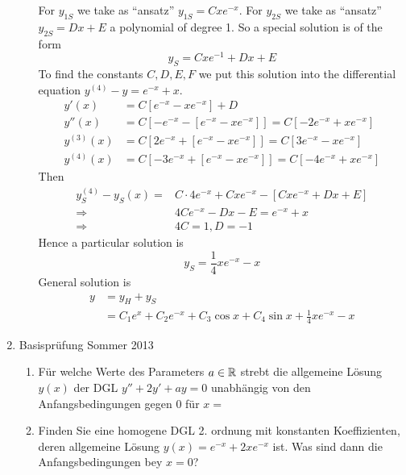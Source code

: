 \documentclass[a4paper]{article}
\begin{document}
\begin{enumerate}
\begin{enumerate}
For $y_{1S}$ we take as ``ansatz'' $y_{1S}= Cxe^{-x}$. For $y_{2S}$ we take as ``ansatz'' $y_{2S}= Dx+E$ a polynomial of degree 1. So a special solution is of the form 
\[y_S = Cxe^{-1}+Dx+E\]
To find the constants $C,D,E,F$ we put this solution into the differential equation $y^{(4)}-y=e^{-x}+x$.
\begin{align*}
y'(x)&=C\left[e^{-x}-xe^{-x}\right]+D\\
y''(x)&=C\left[-e^{-x}-\left[e^{-x}-xe^{-x}\right]\right] = C\left[ -2e^{-x}+xe^{-x}\right]\\
y^{(3)}(x)&=C\left[2e^{-x}+\left[e^{-x}-xe^{-x}\right]\right] = C\left[3e^{-x}-xe^{-x}\right]\\
y^{(4)}(x)&=C\left[-3e^{-x}+\left[e^{-x}-xe^{-x}\right]\right] = C\left[-4e^{-x}+xe^{-x}\right]
\end{align*}
Then 
\begin{align*}
y^{(4)}_S-y_S(x) =& C\cdot 4e^{-x}+Cxe^{-x}-\left[ Cxe^{-x}+Dx+E\right]\\
\Rightarrow & 4Ce^{-x} -Dx-E = e^{-x}+x\\
\Rightarrow & 4C=1, D=-1
\end{align*}
Hence a particular solution is \[y_S=\frac{1}{4}xe^{-x}-x\]
General solution is 
\begin{align*}
y&=y_H+y_S\\
&=C_1e^x + C_2e^{-x}+C_3\cos x+C_4\sin x + \frac{1}{4}xe^{-x}-x
\end{align*}
\end{enumerate}
\item Basisprüfung Sommer 2013
\begin{enumerate}
\item Für welche Werte des Parameters $a\in\mathbb{R}$ strebt die allgemeine Lösung $y(x)$ der DGL $y''+2y'+ay=0$ unabhängig von den Anfangsbedingungen gegen 0 für $x=$
\item Finden Sie eine homogene DGL 2. ordnung mit konstanten Koeffizienten, deren allgemeine Lösung $y(x)=e^{-x}+2xe^{-x}$ ist. Was sind dann die Anfangsbedingungen bey $x=0$?
\end{enumerate}

\end{enumerate}
\end{document}
